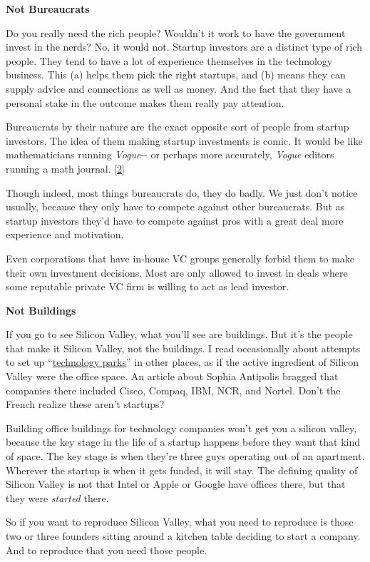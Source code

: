 \textbf{Not Bureaucrats}

Do you really need the rich people? Wouldn't it work to have the
government invest in the nerds? No, it would not. Startup investors are
a distinct type of rich people. They tend to have a lot of experience
themselves in the technology business. This (a) helps them pick the
right startups, and (b) means they can supply advice and connections as
well as money. And the fact that they have a personal stake in the
outcome makes them really pay attention.

Bureaucrats by their nature are the exact opposite sort of people from
startup investors. The idea of them making startup investments is comic.
It would be like mathematicians running \emph{Vogue}-\/- or perhaps more
accurately, \emph{Vogue} editors running a math journal.
{[}\hyperref[f2n]{2}{]}

Though indeed, most things bureaucrats do, they do badly. We just don't
notice usually, because they only have to compete against other
bureaucrats. But as startup investors they'd have to compete against
pros with a great deal more experience and motivation.

Even corporations that have in-house VC groups generally forbid them to
make their own investment decisions. Most are only allowed to invest in
deals where some reputable private VC firm is willing to act as lead
investor.

\textbf{Not Buildings}

If you go to see Silicon Valley, what you'll see are buildings. But it's
the people that make it Silicon Valley, not the buildings. I read
occasionally about attempts to set up
``\href{http://www.google.com/search?q=technology+park}{technology
parks}'' in other places, as if the active ingredient of Silicon Valley
were the office space. An article about Sophia Antipolis bragged that
companies there included Cisco, Compaq, IBM, NCR, and Nortel. Don't the
French realize these aren't startups?

Building office buildings for technology companies won't get you a
silicon valley, because the key stage in the life of a startup happens
before they want that kind of space. The key stage is when they're three
guys operating out of an apartment. Wherever the startup is when it gets
funded, it will stay. The defining quality of Silicon Valley is not that
Intel or Apple or Google have offices there, but that they were
\emph{started} there.

So if you want to reproduce Silicon Valley, what you need to reproduce
is those two or three founders sitting around a kitchen table deciding
to start a company. And to reproduce that you need those people.

